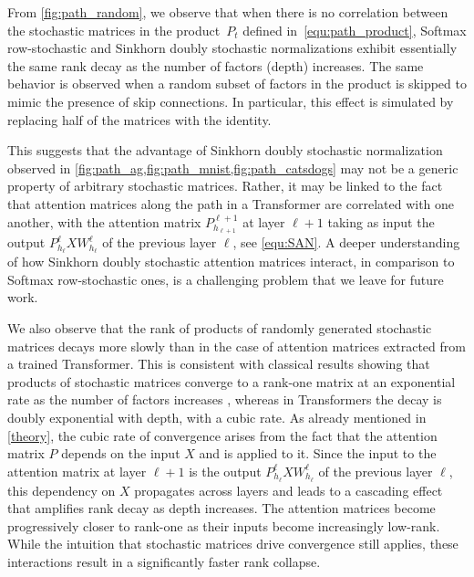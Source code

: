 \documentclass{article}
\theoremstyle{definition}
\theoremstyle{plain}
\begin{document}
\begin{appendices}
From \cref{fig:path_random}, we observe that when there is no correlation between the stochastic matrices in the product~$P_t$ defined in~\ref{equ:path_product}, Softmax row-stochastic and Sinkhorn doubly stochastic normalizations exhibit essentially the same rank decay as the number of factors (depth) increases. The same behavior is observed when a random subset of factors in the product is skipped to mimic the presence of skip connections. In particular, this effect is simulated by replacing half of the matrices with the identity. 

This suggests that the advantage of Sinkhorn doubly stochastic normalization observed in \cref{fig:path_ag,fig:path_mnist,fig:path_catsdogs} may not be a generic property of arbitrary stochastic matrices. Rather, it may be linked to the fact that attention matrices along the path in a Transformer are correlated with one another, with the attention matrix $P^{\ell+1}_{h_{\ell+1}}$ at layer $\ell+1$ taking as input the output $P^{\ell}_{h_\ell} X W^{\ell}_{h_\ell}$ of the previous layer $\ell$, see \ref{equ:SAN}. A deeper understanding of how Sinkhorn doubly stochastic attention matrices interact, in comparison to Softmax row-stochastic ones, is a challenging problem that we leave for future work.

We also observe that the rank of products of randomly generated stochastic matrices decays more slowly than in the case of attention matrices extracted from a trained Transformer. This is consistent with classical results showing that products of stochastic matrices converge to a rank-one matrix at an exponential rate as the number of factors increases \cite{Anthonisse1977ExponentialCO}, whereas in Transformers the decay is doubly exponential with depth, with a cubic rate. As already mentioned in \cref{theory}, the cubic rate of convergence arises from the fact that the attention matrix $P$ depends on the input $X$ and is applied to it. Since the input to the attention matrix at layer $\ell+1$ is the output $P^{\ell}_{h_\ell} X W^{\ell}_{h_\ell}$ of the previous layer $\ell$, this dependency on $X$ propagates across layers and leads to a cascading effect that amplifies rank decay as depth increases. The attention matrices become progressively closer to rank-one as their inputs become increasingly low-rank. While the intuition that stochastic matrices drive convergence still applies, these interactions result in a significantly faster rank collapse.

\end{appendices}
\end{document}
